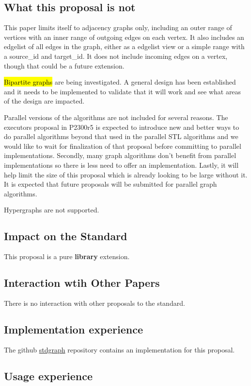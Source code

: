 \documentclass[10pt,onecolumn]{article}
\begin{document}
\subsection{What this proposal is  \textbf{not}}
This paper limits itself to adjacency graphs only, including an outer range of vertices with an inner range of outgoing edges on each vertex. It also includes an edgelist of all edges in the graph, either as a edgelist view or a simple range with a source\_id and target\_id. It does not include incoming edges on a vertex, though that could be a future extension.

\hl{Bipartite graphs} are being investigated. A general design has been established and it needs to be implemented to validate that it will work and see what areas of the design are impacted.

Parallel versions of the algorithms are not included for several reasons. The executors proposal in P2300r5 \cite{REF_P2300r5} is expected to introduce new and better ways to do parallel algorithms beyond that used in the parallel STL algorithms and we would like to wait for finalization of that proposal before committing to parallel implementations. Secondly, many graph algorithms don't benefit from parallel implementations so there is less need to offer an implementation. Lastly, it will help limit the size of this proposal which is already looking to be large without it. It is expected that future proposals will be submitted for parallel graph algorithms. 

Hypergraphs are not supported.

\subsection{Impact on the Standard}
This proposal is a pure \textbf{library} extension.

\subsection{Interaction wtih Other Papers}
There is no interaction with other proposals to the standard.

\subsection{Implementation experience}
The github \href{https://github.com/stdgraph}{stdgraph} repository contains an implementation for this proposal.

\subsection{Usage experience}
\end{document}
